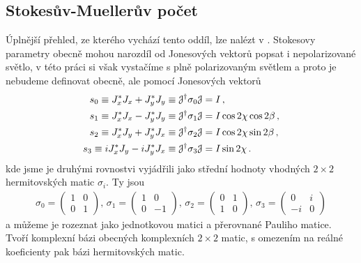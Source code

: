 \subsection{Stokesův-Muellerův počet}
\label{chap:Stokes-Mueller}

Úplnější přehled, ze kterého vychází tento oddíl, lze nalézt v \cite{gilReviewMuellerMatrix2014,ossikovskiPoincareSphereMapping2013}.
Stokesovy parametry obecně mohou narozdíl od Jonesových vektorů popsat i nepolarizované světlo,
v této práci si však vystačíme s plně polarizovaným světlem a proto je nebudeme definovat obecně, ale pomocí Jonesových vektorů
\begin{align}
    s_0 \equiv J_x^* J_x+J_y^* J_y\equiv \mathcal{J}^\dagger \sigma_0 \mathcal{J} &= I \,,\\
    s_1 \equiv J_x^* J_x-J_y^* J_y\equiv \mathcal{J}^\dagger \sigma_1 \mathcal{J} &= I \cos 2\chi \cos 2\beta \,,  \\
    s_2 \equiv J_x^* J_y+J_y^* J_x\equiv \mathcal{J}^\dagger \sigma_2 \mathcal{J} &= I \cos 2\chi \sin 2\beta \,, \\
    s_3 \equiv i J_x^* J_y-i J_y^* J_x  \equiv \mathcal{J}^\dagger \sigma_3 \mathcal{J} &= I \sin 2\chi \,.
\end{align}
kde jsme je druhými rovnostvi vyjádřili jako střední hodnoty vhodných $2\times 2$ hermitovských matic $\sigma_{i}$. Ty jsou
\begin{align}
    \sigma_0=\begin{pmatrix} 1 & 0 \\ 0 & 1 \end{pmatrix} ,\,
    \sigma_1=\begin{pmatrix} 1 & 0 \\ 0 & -1 \end{pmatrix} ,\,
    \sigma_2=\begin{pmatrix} 0 & 1 \\ 1 & 0 \end{pmatrix} ,\,
    \sigma_3=\begin{pmatrix} 0 & i \\ -i & 0 \end{pmatrix}
\end{align}
a můžeme je rozeznat jako jednotkovou matici a přerovnané Pauliho matice.
Tvoří komplexní bázi obecných komplexních $2\times 2$ matic, s omezením na reálné koeficienty pak bázi hermitovských matic. 

